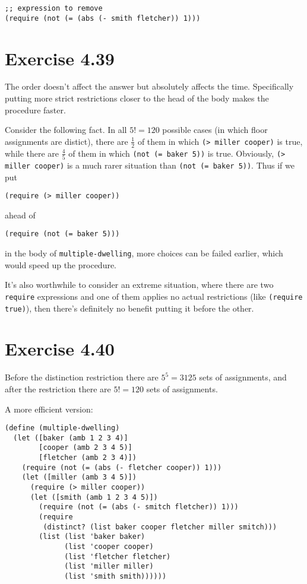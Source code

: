 \documentclass[../main.tex]{subfiles}
\begin{document}
\begin{lstlisting}
;; expression to remove
(require (not (= (abs (- smith fletcher)) 1)))
\end{lstlisting}

\section{Exercise 4.39}

The order doesn't affect the answer but absolutely affects the time. Specifically putting more strict restrictions closer to the head of the body makes the procedure faster.

Consider the following fact. In all $5!=120$ possible cases (in which floor assignments are distict), there are $\frac{1}{2}$ of them in which \lstinline{(> miller cooper)} is true, while there are $\frac{4}{5}$ of them in which \lstinline{(not (= baker 5))} is true. Obviously, \lstinline{(> miller cooper)} is a much rarer situation than \lstinline{(not (= baker 5))}. Thus if we put

\begin{lstlisting}
(require (> miller cooper))
\end{lstlisting}

ahead of

\begin{lstlisting}
(require (not (= baker 5)))
\end{lstlisting}

in the body of \lstinline{multiple-dwelling}, more choices can be failed earlier, which would speed up the procedure.

It's also worthwhile to consider an extreme situation, where there are two \lstinline{require} expressions and one of them applies no actual restrictions (like \lstinline{(require true)}), then there's definitely no benefit putting it before the other.

\section{Exercise 4.40}

Before the distinction restriction there are $5^5=3125$ sets of assignments, and after the restriction there are $5!=120$ sets of assignments.

A more efficient version:

\begin{lstlisting}
(define (multiple-dwelling)
  (let ([baker (amb 1 2 3 4)]
        [cooper (amb 2 3 4 5)]
        [fletcher (amb 2 3 4)])
    (require (not (= (abs (- fletcher cooper)) 1)))
    (let ([miller (amb 3 4 5)])
      (require (> miller cooper))
      (let ([smith (amb 1 2 3 4 5)])
        (require (not (= (abs (- smitch fletcher)) 1)))
        (require
         (distinct? (list baker cooper fletcher miller smitch)))
        (list (list 'baker baker)
              (list 'cooper cooper)
              (list 'fletcher fletcher)
              (list 'miller miller)
              (list 'smith smith))))))
\end{lstlisting}
\end{document}
